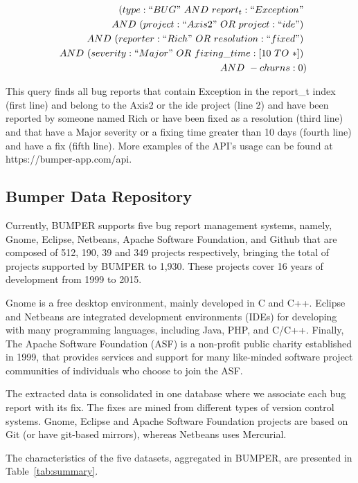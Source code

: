 \documentclass[conference]{IEEEtran}
\begin{document}
\begin{equation*}
\begin{split}
  (type:``BUG"~AND~report_t:``Exception"~\\
~~AND~(project:``Axis2"~OR~project:``ide")~\\
~~AND~(reporter:``Rich"~OR~resolution:``fixed")~\\
~~AND~(severity:``Major"~OR~fixing\_time:[10~TO~*])~\\
~~AND~-churns:0)
\end{split}
\end{equation*}

This query finds all bug reports that contain Exception in the
report\_t index (first line) and belong to the Axis2 or the ide
project (line 2) and have been reported by someone named Rich
or have been fixed as a resolution (third line) and that have a
Major severity or a fixing time greater than 10 days (fourth line)
and have a fix (fifth line).
More examples of the API's usage can
be found at https://bumper-app.com/api.


\subsection{Bumper Data Repository}
\label{sub:Bumper Data Repository}

Currently, BUMPER supports five bug report management systems, namely, Gnome, Eclipse, Netbeans, Apache Software Foundation, and Github that are composed of 512, 190, 39 and 349 projects respectively, bringing the total of projects supported by BUMPER to 1,930. These projects cover 16 years of development from 1999 to 2015. 

Gnome is a free desktop environment, mainly developed in C and C++. Eclipse and Netbeans are integrated development environments (IDEs) for developing with many programming languages, including Java, PHP, and C/C++. Finally, The Apache Software Foundation (ASF) is a non-profit public charity established in 1999, that provides services and support for many like-minded software project communities of individuals who choose to join the ASF.

The extracted data is consolidated in one database where we associate each bug report with its fix.
The fixes are mined from different types of version control systems. Gnome, Eclipse and Apache Software Foundation projects are based on Git (or have git-based mirrors), whereas Netbeans uses Mercurial.

The characteristics of the five datasets, aggregated in BUMPER,  are presented in Table~\ref{tab:summary}.
\end{document}
